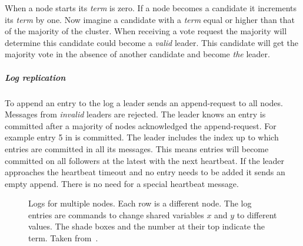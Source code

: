 When a node starts its \textit{term} is zero. If a node becomes a candidate it increments its \textit{term} by one. Now imagine a candidate with a \textit{term} equal or higher than that of the majority of the cluster. When receiving a vote request the majority will determine this candidate could become a \emph{valid} leader. This candidate will get the majority vote in the absence of another candidate and become \textit{the} leader.

\subparagraph{Log replication}
To append an entry to the log a leader sends an append-request to all nodes. Messages from \textit{invalid} leaders  are rejected. The leader knows an entry is committed after a majority of nodes acknowledged the append-request. For example entry 5 in  is committed. The leader includes the index up to which entries are committed in all its messages. This means entries will become committed on all followers at the latest with the next heartbeat. If the leader approaches the heartbeat timeout and no entry needs to be added it sends an empty append. There is no need for a special heartbeat message.

\begin{figure}[htbp]
	\centering
	
	\caption{Logs for multiple nodes. Each row is a different node. The log entries are commands to change shared variables $x$ and $y$ to different values. The shade boxes and the number at their top indicate the term. Taken from~\cite{raft}.}
	\label{fig:raft_entries}
\end{figure}

